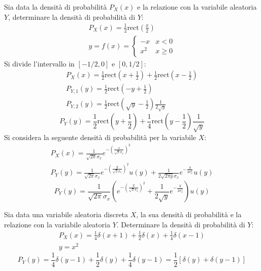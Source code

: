 \documentclass{article}
\newcommand{\rect}{\mbox{rect}}
\begin{document}
Sia data la densità di probabilità $P_X(x)$ e la relazione con la variabile aleatoria $Y$, determinare la densità di probabilità di $Y$:
\begin{gather*}
    P_X(x)=\displaystyle\frac{1}{2}\rect\left(\frac{x}{2}\right)\\
    y=f(x)=\begin{cases}
        -x&x<0\\
        x^2&x\geq 0
    \end{cases}
\end{gather*}
Si divide l'intervallo in $[-1/2,0]$ e $[0,1/2]$:
\begin{gather*}
    P_X(x)=\displaystyle\frac{1}{2}\rect\left(x+\frac{1}{2}\right)+\frac{1}{2}\rect\left(x-\frac{1}{2}\right)\\
    P_{Y,1}(y)=\displaystyle\frac{1}{2}\rect\left(-y+\frac{1}{2}\right)\\
    P_{Y,2}(y)=\displaystyle\frac{1}{2}\rect\left(\sqrt{y}-\frac{1}{2}\right)\frac{1}{2\sqrt{y}}
\end{gather*}
\begin{equation}
    P_Y(y)=\displaystyle\frac{1}{2}\rect\left(y+\frac{1}{2}\right)+\frac{1}{4}\rect\left(y-\frac{1}{2}\right)\frac{1}{\sqrt{y}}
\end{equation}
Si considera la seguente densità di probabilità per la variabile $X$:
\begin{gather*}
    P_X(x)=\displaystyle\frac{1}{\sqrt{2\pi}\sigma_x}e^{-\left(\frac{x}{\sqrt2\sigma_x}\right)^2}\\
    P_Y(y)=\displaystyle\frac{1}{\sqrt{2\pi}\sigma_x}e^{-\left(\frac{y}{\sqrt2\sigma_x}\right)^2}u(y)+\frac{1}{2\sqrt{2\pi y} \sigma_x}e^{-\frac{y}{2\sigma_x^2}}u(y)
\end{gather*}
\begin{equation}
    P_Y(y)=\displaystyle\frac{1}{\sqrt{2\pi}\sigma_x}\left(e^{-\left(\frac{y}{\sqrt2\sigma_x}\right)^2}+\frac{1}{2\sqrt{y}}e^{-\frac{y}{2\sigma_x^2}}\right)u(y)
\end{equation}



Sia data una variabile aleatoria discreta $X$, la sua densità di probabilità e la relazione con la variabile aleatoria $Y$. Determinare la densità di probabilità di $Y$:
\begin{gather*}
    P_X(x)=\displaystyle\frac{1}{4}\delta(x+1)+\frac{1}{2}\delta(x)+\frac{1}{4}\delta(x-1)\\
    y=x^2
\end{gather*}
\begin{equation}
    P_Y(y)=\displaystyle\frac{1}{4}\delta(y-1)+\frac{1}{2}\delta(y)+\frac{1}{4}\delta(y-1)=\frac{1}{2}\left[\delta(y)+\delta(y-1)\right]
\end{equation}
\end{document}
